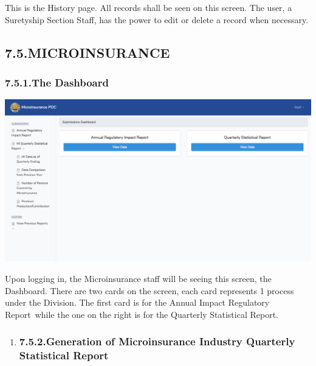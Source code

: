 \documentclass{article}
\begin{document}
\noindent{}This is the History page. All records shall be seen on
this screen. The user, a Suretyship Section Staff, has the power to edit
or delete a record when necessary.%

\subsection{7.5.\hspace*{0.5em}MICROINSURANCE}\label{sec-microinsurance}%

\subsubsection{7.5.1.\hspace*{0.5em}The Dashboard}\label{sec-the-dashboard}%

\noindent{}\includegraphics[keepaspectratio=true]{up-ic-screens/image194}{}%

Upon logging in, the Microinsurance staff will be
seeing this screen, the Dashboard. There are two cards on the screen,
each card represents 1 process under the Division. The first card is for
the Annual Impact Regulatory Report while the one on the right is for the Quarterly Statistical Report.%

\begin{enumerate}[noitemsep,topsep=\mdcompacttopsep]%

\item{}
\subsubsection{7.5.2.\hspace*{0.5em}Generation of Microinsurance Industry Quarterly Statistical Report}\label{sec-generation-of-microinsurance-industry-quarterly-statistical-report}%
\end{enumerate}%
\end{document}
